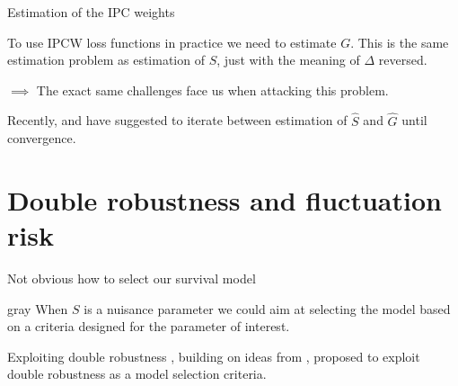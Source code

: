 \documentclass[smaller]{beamer}\usepackage{listings}
\begin{document}
\begin{frame}[label={sec:org1c1f34f}]{Estimation of the IPC weights}
\small

To use IPCW loss functions in practice we need to estimate \(G\). This is the same estimation
problem as estimation of \(S\), just with the meaning of \(\Delta\) reversed. 

\vfill

\(\implies\) The exact same challenges face us when attacking this problem.

\vfill

\def\shift{2.3}
\def\ls{}
\def\lw{.5mm}
\begin{center}
\end{center}

\vfill

Recently, \cite{han2021inverse} and \cite{westling2021inference} have suggested to iterate between
estimation of \(\hat S\) and \(\hat G\) until convergence.
\end{frame}


\section{Double robustness and fluctuation risk}
\label{sec:org85dfb91}
\begin{frame}[label={sec:org52e2c82}]{}
\begin{block}{\centering Not obvious how to select our survival model}
\pause
\end{block}
\begin{block}{}
\end{block}
\begin{beamercolorbox}[rounded=true]{gray}
\centering When \(S\) is a nuisance parameter we could aim at selecting the model based on a
criteria designed for the parameter of interest. \pause
\end{beamercolorbox}

\begin{block}{}
\end{block}

\begin{block}{Exploiting double robustness}
\cite{tchetgenYifanTagetDML}, building on ideas from \cite{robins2007comment}, proposed to exploit
double robustness as a model selection criteria.
\end{block}
\end{frame}
\end{document}
